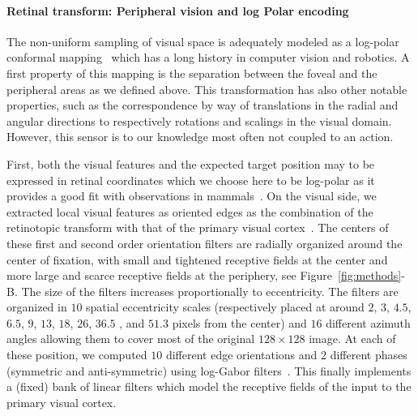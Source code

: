 \paragraph{Retinal transform: Peripheral vision and log Polar encoding}
%
%
%
The non-uniform sampling of visual space is adequately modeled as a log-polar conformal mapping~\citep{Traver10} which has a long history in computer vision and robotics. A first property of this mapping is the separation between the foveal and the peripheral areas as we defined above. This transformation has also other notable properties, such as the correspondence by way of translations in the radial and angular directions to respectively rotations and scalings in the visual domain. However, this sensor is to our knowledge most often not coupled to an action. 

First, both the visual features and the expected target position may to be expressed in retinal coordinates which we choose here to be log-polar as it provides a good fit with observations in mammals~\citep{Traver10}. On the visual side, we extracted local visual features as oriented edges as the combination of the retinotopic transform with that of the primary visual cortex~\citep{Fischer2007a}. The centers of these first and second order orientation filters are radially organized around the center of fixation, with small and tightened receptive fields at the center and more large and scarce receptive fields at the periphery, see Figure~\ref{fig:methods}-B. The size of the filters increases proportionally to eccentricity. The filters are organized in $10$ spatial eccentricity scales (respectively placed at around $2$, $3$, $4.5$, $6.5$, $9$, $13$, $18$, $26$, $36.5$ , and $51.3$ pixels from the center) and $16$ different azimuth angles allowing them to cover most of the original $128 \times 128 $ image. At each of these position, we computed $10$ different edge orientations and $2$ different phases (symmetric and anti-symmetric) using log-Gabor filters~\citep{Fischer2007a}. This finally implements a (fixed) bank of linear filters which model the receptive fields of the input to the primary visual cortex.

